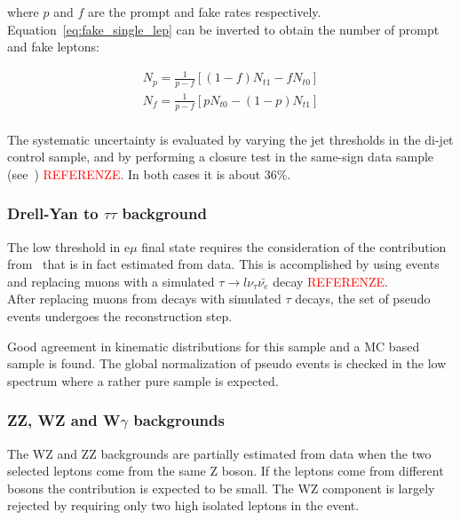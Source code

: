 where $p$ and $f$ are the prompt and fake rates respectively. Equation~\eqref{eq:fake_single_lep} can be inverted to obtain the number of prompt and fake leptons:

\begin{equation}\label{eq:fake_prompt}
\begin{gathered}
    N_p = \frac{1}{p-f}\left[ (1-f)N_{t1} - fN_{t0}  \right]\\
    N_f = \frac{1}{p-f}\left[ pN_{t0} - (1-p)N_{t1}  \right]\\
\end{gathered}
\end{equation}

The systematic uncertainty is evaluated by varying the jet thresholds in the di-jet control sample, and by
performing a closure test in the same-sign data sample (see~\cite{AN-2013-022}) \textcolor{red}{REFERENZE}. In both cases it is about 36\%.

	\subsubsection{Drell-Yan to \texorpdfstring{$\tau\tau$}{tau tau} background\label{sec:DYtautaubkg}}


The low \MET threshold in e$\mu$ final state
requires the consideration of the contribution from 
\dytt\, that is in fact estimated from data.
This is accomplished by using 
\dymm events and replacing muons with a simulated
$\tau\to l\nu_\tau\bar{\nu_e}$ decay \cite{AN-2011-020} \textcolor{red}{REFERENZE}.\\
After replacing muons from \dymm decays with simulated $\tau$ decays,
the set of pseudo \dytt events undergoes the reconstruction step.
 
Good agreement in kinematic distributions for this sample
and a MC based \dytt sample is found.
The global normalization of pseudo \dytt events is 
checked in the low \mt spectrum where a rather pure
\dytt sample is expected.


	\subsubsection{ZZ, WZ and W\texorpdfstring{$\gamma$}{gamma} backgrounds\label{sec:otherbkg}}

The WZ and ZZ backgrounds are partially estimated from data when the two
selected leptons come from the same Z boson. If the leptons come from different
bosons the contribution is expected to be small. The WZ component is largely
rejected by requiring only two high \pt isolated leptons in the event. 

